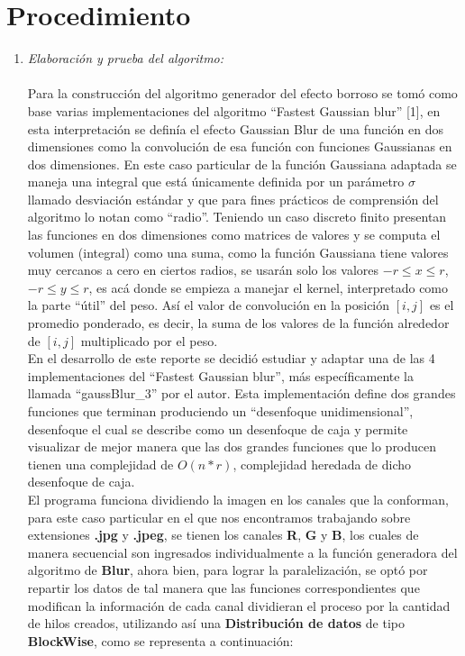 \documentclass[a4paper,10pt]{IEEEtran}
\begin{document}
\section{Procedimiento} 
\begin{enumerate}
    \item \textit{Elaboraci\'on y prueba del algoritmo:}  \\ \\
    Para la construcci\'on del algoritmo generador del efecto borroso se tom\'o
    como base varias implementaciones del algoritmo “Fastest Gaussian blur” [1],
    en esta interpretaci\'on se defin\'ia el efecto Gaussian Blur de una
    funci\'on en dos dimensiones como la convoluci\'on de esa funci\'on con
    funciones Gaussianas en dos dimensiones. En este caso particular de la
    funci\'on Gaussiana adaptada se maneja una integral que est\'a \'unicamente
    definida por un par\'ametro $\sigma$ llamado desviaci\'on estándar y que para
    fines prácticos de comprensión del algoritmo lo notan como “radio”. Teniendo
    un caso discreto finito presentan las funciones en dos dimensiones como
    matrices de valores y se computa el volumen (integral) como una suma, como la
    funci\'on Gaussiana tiene valores muy cercanos a cero en ciertos radios, se
    usar\'an solo los valores $- r\leq x\leq r$, $- r\leq y \leq r$, es ac\'a
    donde se empieza a manejar el kernel, interpretado como la parte “\'util” del
    peso. As\'i el valor de convoluci\'on en la posici\'on $[i, j]$ es el
    promedio ponderado, es decir, la suma de los valores de la funci\'on
    alrededor de $[i, j]$ multiplicado por el peso. \\
    
    En el desarrollo de este reporte se decidi\'o estudiar y adaptar una de las 4
    implementaciones del “Fastest Gaussian blur”, m\'as espec\'ificamente la
    llamada “gaussBlur\_3” por el autor. Esta implementaci\'on define dos grandes funciones que terminan produciendo un “desenfoque unidimensional”, desenfoque el cual se describe como un desenfoque de caja y permite visualizar de mejor manera que las dos grandes funciones que lo producen tienen una complejidad de $O(n * r)$, complejidad heredada de dicho desenfoque de caja.\\
    
    El programa funciona dividiendo la imagen en los canales que la conforman, para este caso particular en el que nos encontramos trabajando sobre extensiones \textbf{.jpg} y \textbf{.jpeg}, se tienen los canales \textbf{R}, \textbf{G} y \textbf{B}, los cuales de manera secuencial son ingresados individualmente a la funci\'on generadora del algoritmo de \textbf{Blur}, ahora bien, para lograr la paralelizaci\'on, se opt\'o por repartir los datos de tal manera que las funciones correspondientes que modifican la informaci\'on de cada canal dividieran el proceso por la cantidad de hilos creados, utilizando as\'i una
    \textbf{Distribuci\'on de datos} de tipo \textbf{BlockWise}, como se representa a continuaci\'on: \\
    

\end{enumerate}
\end{document}
